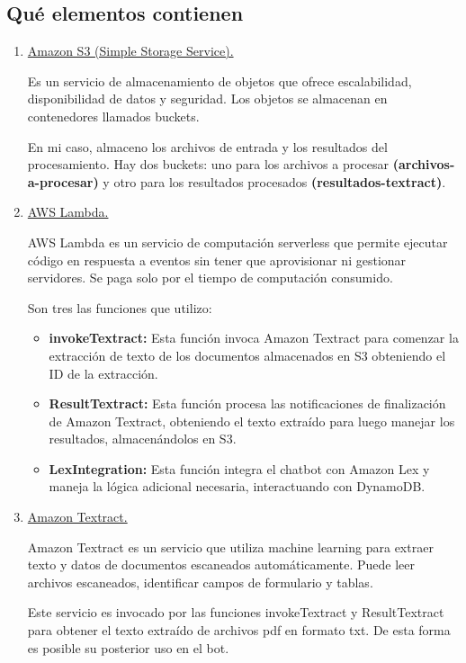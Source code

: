\subsection{Qué elementos contienen}\label{elementos-aws}
\begin{enumerate}

    \item \underline{Amazon S3 (Simple Storage Service).}
    
    Es un servicio de almacenamiento de objetos que ofrece escalabilidad, disponibilidad de datos y seguridad. Los objetos se almacenan en contenedores llamados buckets. 
    
    En mi caso, almaceno los archivos de entrada y los resultados del procesamiento. Hay dos buckets: uno para los archivos a procesar \textbf{(archivos-a-procesar)} y otro para los resultados procesados \textbf{(resultados-textract)}.
    
    \item \underline{AWS Lambda.}

    AWS Lambda es un servicio de computación serverless que permite ejecutar código en respuesta a eventos sin tener que aprovisionar ni gestionar servidores. Se paga solo por el tiempo de computación consumido.
    
    Son tres las funciones que utilizo:
    \begin{itemize}
        \item \textbf{invokeTextract:} Esta función invoca Amazon Textract para comenzar la extracción de texto de los documentos almacenados en S3 obteniendo el ID de la extracción.
        \item \textbf{ResultTextract:} Esta función procesa las notificaciones de finalización de Amazon Textract, obteniendo el texto extraído para luego manejar los resultados, almacenándolos en S3.
        \item \textbf{LexIntegration:} Esta función integra el chatbot con Amazon Lex y maneja la lógica adicional necesaria, interactuando con DynamoDB.
    \end{itemize}

    \item \underline{Amazon Textract.}

    Amazon Textract es un servicio que utiliza machine learning para extraer texto y datos de documentos escaneados automáticamente. Puede leer archivos escaneados, identificar campos de formulario y tablas.

    Este servicio es invocado por las funciones invokeTextract y ResultTextract para obtener el texto extraído de archivos pdf en formato txt. De esta forma es posible su posterior uso en el bot.
    

\end{enumerate}
